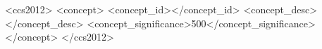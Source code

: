 \documentclass[manuscript,screen,review]{acmart}
\begin{document}
\title{}

\author{}
\email{}
\affiliation{%
  \institution{}
  \city{}
  \state{}
  \country{}
}


\renewcommand{\shortauthors}{}

\begin{abstract}

\end{abstract}

\begin{CCSXML}
<ccs2012>
 <concept>
  <concept_id></concept_id>
  <concept_desc></concept_desc>
  <concept_significance>500</concept_significance>
 </concept>
</ccs2012>
\end{CCSXML}

\ccsdesc[500]{}

\keywords{}


\end{document}

